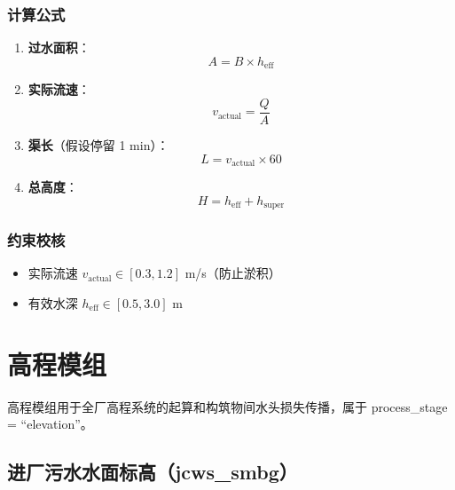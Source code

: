 \documentclass[12pt,a4paper]{ctexart}
\begin{document}
\subsubsection{计算公式}

\begin{enumerate}[label=(\arabic*), leftmargin=*]
    \item \textbf{过水面积}：
    \begin{equation}
        A = B \times h_{\text{eff}}
    \end{equation}

    \item \textbf{实际流速}：
    \begin{equation}
        v_{\text{actual}} = \frac{Q}{A}
    \end{equation}

    \item \textbf{渠长}（假设停留 1 min）：
    \begin{equation}
        L = v_{\text{actual}} \times 60
    \end{equation}

    \item \textbf{总高度}：
    \begin{equation}
        H = h_{\text{eff}} + h_{\text{super}}
    \end{equation}
\end{enumerate}

\subsubsection{约束校核}
\begin{itemize}[itemsep=0pt]
    \item 实际流速 $v_{\text{actual}} \in [0.3, 1.2]$ m/s（防止淤积）
    \item 有效水深 $h_{\text{eff}} \in [0.5, 3.0]$ m
\end{itemize}

\newpage

\section{高程模组}

高程模组用于全厂高程系统的起算和构筑物间水头损失传播，属于 process\_stage = ``elevation''。

\subsection{进厂污水水面标高（jcws\_smbg）}
\end{document}
